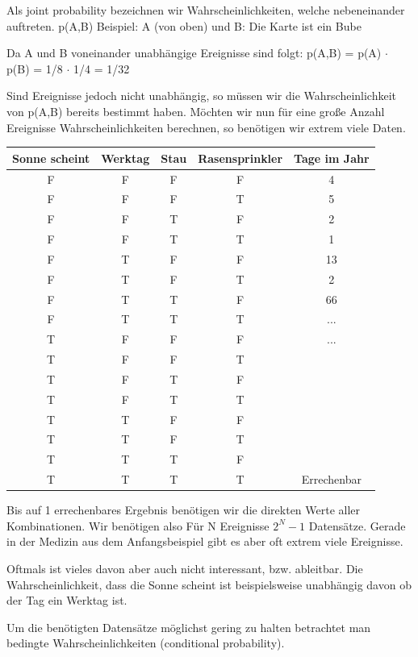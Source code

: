 Als joint probability bezeichnen wir Wahrscheinlichkeiten, welche nebeneinander auftreten. p(A,B)
Beispiel: A (von oben) und B: Die Karte ist ein Bube

Da A und B voneinander unabhängige Ereignisse sind folgt:
p(A,B) = p(A) $\cdot$ p(B) = 1/8 $\cdot$ 1/4 = 1/32

Sind Ereignisse jedoch nicht unabhängig, so müssen wir die Wahrscheinlichkeit von p(A,B) bereits bestimmt haben.
Möchten wir nun für eine große Anzahl Ereignisse Wahrscheinlichkeiten berechnen, so benötigen wir extrem viele Daten.

\begin{center}
\begin{tabular}{ ccccc } \toprule
Sonne scheint & Werktag & Stau & Rasensprinkler & Tage im Jahr \\ \midrule
F & F & F & F & 4 \\
F & F & F & T & 5 \\
F & F & T & F & 2 \\
F & F & T & T & 1 \\
F & T & F & F & 13 \\
F & T & F & T & 2 \\
F & T & T & F & 66 \\
F & T & T & T & ... \\
T & F & F & F & ... \\
T & F & F & T & \\
T & F & T & F & \\
T & F & T & T & \\
T & T & F & F & \\
T & T & F & T & \\
T & T & T & F & \\
T & T & T & T & Errechenbar \\
\bottomrule
\end{tabular}
\end{center}


Bis auf 1 errechenbares Ergebnis benötigen wir die direkten Werte aller Kombinationen.
Wir benötigen also Für N Ereignisse $2^N-1$ Datensätze.
Gerade in der Medizin aus dem Anfangsbeispiel gibt es aber oft extrem viele Ereignisse.

Oftmals ist vieles davon aber auch nicht interessant, bzw. ableitbar.
Die Wahrscheinlichkeit, dass die Sonne scheint ist beispielsweise unabhängig davon ob der Tag ein Werktag ist.

Um die benötigten Datensätze möglichst gering zu halten betrachtet man bedingte Wahrscheinlichkeiten (conditional probability).

